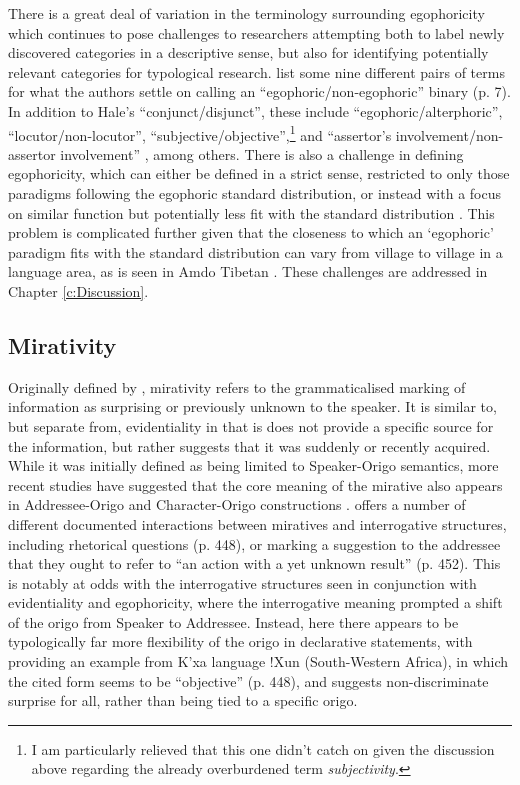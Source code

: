 There is a great deal of variation in the terminology surrounding egophoricity which continues to pose challenges to researchers attempting both to label newly discovered categories in a descriptive sense, but also for identifying potentially relevant categories for typological research.  list some nine different pairs of terms for what the authors settle on calling an ``egophoric/non-egophoric'' binary (p. 7). In addition to Hale's ``conjunct/disjunct'', these include ``egophoric/alterphoric'', ``locutor/non-locutor'', ``subjective/objective'',\footnote{I am particularly relieved that this one didn't catch on given the discussion above regarding the already overburdened term \textit{subjectivity}.} and ``assertor's involvement/non-assertor involvement'' \cite[8]{EgoIntro}, among others. There is also a challenge in defining egophoricity, which can either be defined in a strict sense, restricted to only those paradigms following the egophoric standard distribution, or instead with a focus on similar function but potentially less fit with the standard distribution \cite{EgoIntro}. This problem is complicated further given that the closeness to which an `egophoric' paradigm fits with the standard distribution can vary from village to village in a language area, as is seen in Amdo Tibetan \cite{Tribur2019}. These challenges are addressed in Chapter \ref{c:Discussion}.

\subsection{Mirativity}\label{s:Intro:MirativityIntro}
Originally defined by , mirativity refers to the grammaticalised marking of information as surprising or previously unknown to the speaker. It is similar to, but separate from, evidentiality in that is does not provide a specific source for the information, but rather suggests that it was suddenly or recently acquired. While it was initially defined as being limited to Speaker-Origo semantics, more recent studies have suggested that the core meaning of the mirative also appears in Addressee-Origo and Character-Origo constructions \cites{HengeveldOlbertz2012}{Aikhenvald2012Mirative}.  offers a number of different documented interactions between miratives and interrogative structures, including rhetorical questions (p. 448), or marking a suggestion to the addressee that they ought to refer to ``an action with a yet unknown result'' (p. 452). This is notably at odds with the interrogative structures seen in conjunction with evidentiality and egophoricity, where the interrogative meaning prompted a shift of the origo from Speaker to Addressee. Instead, here there appears to be typologically far more flexibility of the origo in declarative statements, with  providing an example from K'xa language \mbox{!Xun} (South-Western Africa), in which the cited form seems to be ``objective'' (p. 448), and suggests non-discriminate surprise for all, rather than being tied to a specific origo.

